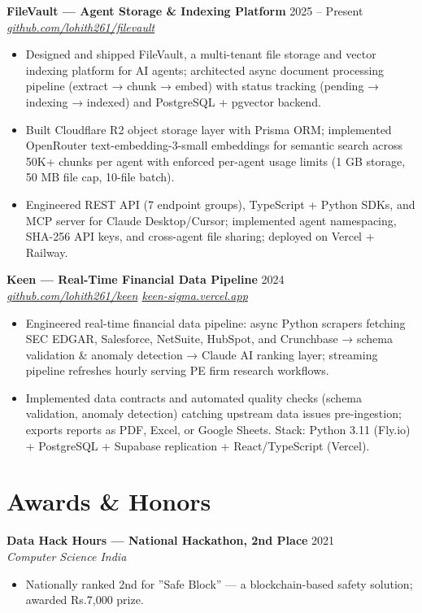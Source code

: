 \documentclass[10pt,letterpaper]{article}
\newcommand{\entry}[3]{%
  \vspace{3pt}\textbf{#1} \hfill #3 \\
  \textit{\small #2}\vspace{1pt}}
\begin{document}
\entry{FileVault --- Agent Storage \& Indexing Platform}{\href{https://github.com/lohith261/filevault}{github.com/lohith261/filevault}}{2025 -- Present}
\begin{itemize}
  \item Designed and shipped FileVault, a multi-tenant file storage and vector indexing platform for AI agents; architected async document processing pipeline (extract → chunk → embed) with status tracking (pending → indexing → indexed) and PostgreSQL + pgvector backend.
  \item Built Cloudflare R2 object storage layer with Prisma ORM; implemented OpenRouter text-embedding-3-small embeddings for semantic search across 50K+ chunks per agent with enforced per-agent usage limits (1 GB storage, 50 MB file cap, 10-file batch).
  \item Engineered REST API (7 endpoint groups), TypeScript + Python SDKs, and MCP server for Claude Desktop/Cursor; implemented agent namespacing, SHA-256 API keys, and cross-agent file sharing; deployed on Vercel + Railway.
\end{itemize}

\entry{Keen --- Real-Time Financial Data Pipeline}{\href{https://github.com/lohith261/keen}{github.com/lohith261/keen} \quad\textbullet\quad \href{https://keen-sigma.vercel.app/}{keen-sigma.vercel.app}}{2024}
\begin{itemize}
  \item Engineered real-time financial data pipeline: async Python scrapers fetching SEC EDGAR, Salesforce, NetSuite, HubSpot, and Crunchbase → schema validation \& anomaly detection → Claude AI ranking layer; streaming pipeline refreshes hourly serving PE firm research workflows.
  \item Implemented data contracts and automated quality checks (schema validation, anomaly detection) catching upstream data issues pre-ingestion; exports reports as PDF, Excel, or Google Sheets. Stack: Python 3.11 (Fly.io) + PostgreSQL + Supabase replication + React/TypeScript (Vercel).
\end{itemize}

\section{Awards \& Honors}

\textbf{Data Hack Hours --- National Hackathon, 2nd Place} \hfill 2021 \\
\textit{Computer Science India}
\begin{itemize}
  \item Nationally ranked 2nd for ''Safe Block'' --- a blockchain-based safety solution; awarded Rs.7,000 prize.
\end{itemize}
\end{document}
